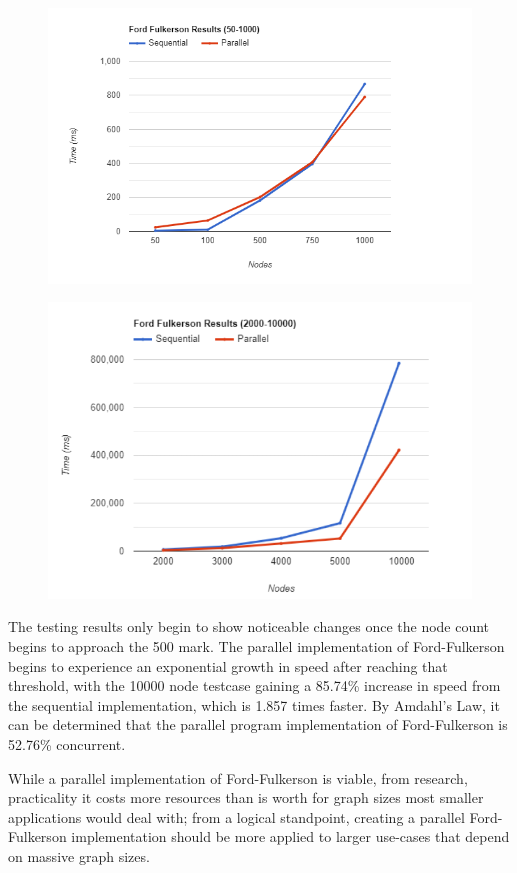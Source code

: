     \begin{figure}[H]
        \centering
        \includegraphics[scale=.48]{figures/low-end-ff.png}
        \label{fig:my_label}
    \end{figure}
    \begin{figure}[H]
        \centering
        \includegraphics[scale=.48]{figures/high-end-ff.png}
        \label{fig:my_label}
    \end{figure}

    The testing results only begin to show noticeable changes once the node count begins to approach the 500 mark. The parallel implementation of Ford-Fulkerson begins to experience an exponential growth in speed after reaching that threshold, with the 10000 node testcase gaining a 85.74\% increase in speed from the sequential implementation, which is 1.857 times faster. By Amdahl's Law, it can be determined that the parallel program implementation of Ford-Fulkerson is 52.76\% concurrent.
    
    While a parallel implementation of Ford-Fulkerson is viable, from research, practicality it costs more resources than is worth for graph sizes most smaller applications would deal with; from a logical standpoint, creating a parallel Ford-Fulkerson implementation should be more applied to larger use-cases that depend on massive graph sizes.
    
    